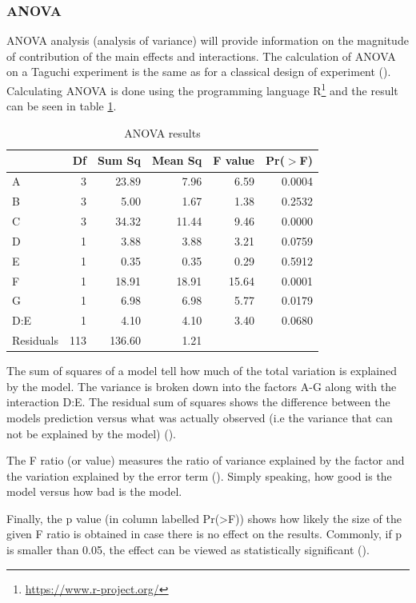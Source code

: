 \subsubsection{ANOVA}
ANOVA analysis (analysis of variance) will provide information on the magnitude of contribution of the main effects and interactions. The calculation of ANOVA on a Taguchi experiment is the same as for a classical design of experiment (\cite{yang_design_2009}). Calculating ANOVA is done using the programming language R\footnote{\href{https://www.r-project.org/}{https://www.r-project.org/}} and the result can be seen in table \ref{table:taguchi:anova_results}.

\begin{table}[ht]
	\centering
	\begin{tabular}{lrrrrr}
		\hline
		& Df & Sum Sq & Mean Sq & F value & Pr($>$F) \\ 
		\hline
		A & 3 & 23.89 & 7.96 & 6.59 & 0.0004 \\ 
		B & 3 & 5.00 & 1.67 & 1.38 & 0.2532 \\ 
		C & 3 & 34.32 & 11.44 & 9.46 & 0.0000 \\ 
		D & 1 & 3.88 & 3.88 & 3.21 & 0.0759 \\ 
		E & 1 & 0.35 & 0.35 & 0.29 & 0.5912 \\ 
		F & 1 & 18.91 & 18.91 & 15.64 & 0.0001 \\ 
		G & 1 & 6.98 & 6.98 & 5.77 & 0.0179 \\ 
		D:E & 1 & 4.10 & 4.10 & 3.40 & 0.0680 \\ 
		Residuals & 113 & 136.60 & 1.21 &  &  \\ 
		\hline
	\end{tabular}
	\caption{ANOVA results}
	\label{table:taguchi:anova_results}
\end{table}

The sum of squares of a model tell how much of the total variation is explained by the model. The variance is broken down into the factors A-G along with the interaction D:E. The residual sum of squares shows the difference between the models prediction versus what was actually observed (i.e the variance that can not be explained by the model) (\cite{field_discovering_2012}).

The F ratio (or value) measures the ratio of variance explained by the factor and the variation explained by the error term (\cite{field_discovering_2012}). Simply speaking, how good is the model versus how bad is the model. 

Finally, the p value (in column labelled Pr(>F)) shows how likely the size of the given F ratio is obtained in case there is no effect on the results. Commonly, if p is smaller than 0.05, the effect can be viewed as statistically significant (\cite{field_discovering_2012}).

